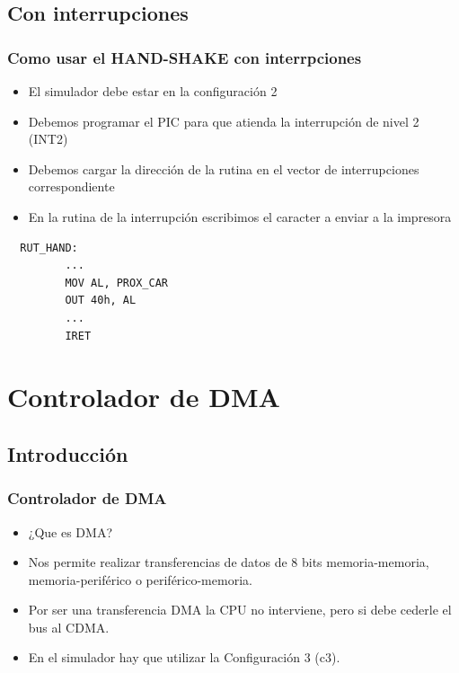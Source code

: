 \documentclass{beamer}
\begin{document}
\subsection{Con interrupciones}
\begin{frame}[fragile]
\frametitle{Como usar el HAND-SHAKE con interrpciones}
\begin{itemize}
 \item El simulador debe estar en la configuración 2
 \item Debemos programar el PIC para que atienda la interrupción de nivel 2 (INT2)
 \item Debemos cargar la dirección de la rutina en el vector de interrupciones correspondiente
 \item En la rutina de la interrupción escribimos el caracter a enviar a la impresora
\end{itemize}

\begin{block}{}
 \begin{verbatim}
  RUT_HAND:
         ...
         MOV AL, PROX_CAR
         OUT 40h, AL
         ...
         IRET
 \end{verbatim}
\end{block}

\end{frame}




\section{Controlador de DMA}
\subsection{Introducción}
\begin{frame}
\frametitle{Controlador de DMA}
\begin{itemize}
  \item ¿Que es DMA?
  \item Nos permite realizar transferencias de datos de 8 bits memoria-memoria, memoria-periférico o periférico-memoria.
  \item Por ser una transferencia DMA la CPU no interviene, pero si debe cederle el bus al CDMA.
  \item En el simulador hay que utilizar la Configuración 3 (c3).
\end{itemize}
\end{frame}
\end{document}
